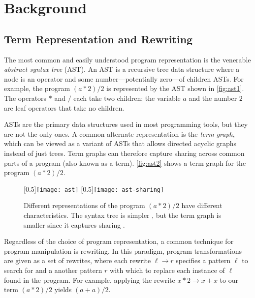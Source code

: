 \chapter{Background}
\label{sec:background}

\section{Term Representation and Rewriting}
\label{sec:rewriting}

The most common and easily understood
 program representation is the venerable
 \textit{abstract syntax tree} (AST).
An AST is a recursive tree data structure
 where a node is an operator and
 some number---potentially zero---of children ASTs.
For example, the program $(a * 2) / 2$
 is represented by the AST shown in \autoref{fig:ast1}.
The operators $*$ and $/$ each take two children;
 the variable $a$ and the number $2$ are leaf operators
 that take no children.

ASTs are the primary data structures used in most programming tools,
 but they are not the only ones.
A common alternate representation is the \textit{term graph},
 which can be viewed as a variant of ASTs that
 allows directed acyclic graphs instead of just trees.
Term graphs can therefore capture sharing across common parts of a
 program (also known as a term).
\autoref{fig:ast2} shows a term graph for the program $(a * 2) / 2$.

\begin{figure}
    [0.5\linewidth]{\texttt{[image: ast]}}
    [0.5\linewidth]{\texttt{[image: ast-sharing]}}
  \caption{
    Different representations of the program $(a * 2) / 2$ have
     different characteristics.
    The syntax tree is simpler ,
     but the term graph is smaller since it captures sharing .
  }\label{fig:ast}
\end{figure}

Regardless of the choice of program representation,
 a common technique for program manipulation is rewriting.
In this paradigm,
 program transformations are given as a set of rewrites,
 where each
 rewrite $\ell \to r$ specifies a pattern $\ell$ to search for
 and a another pattern $r$ with
 which to replace each instance of $\ell$ found
 in the program.
For example, applying the rewrite $x * 2 \to x + x$
 to our term $(a * 2) / 2$ yields $(a + a) / 2$.


